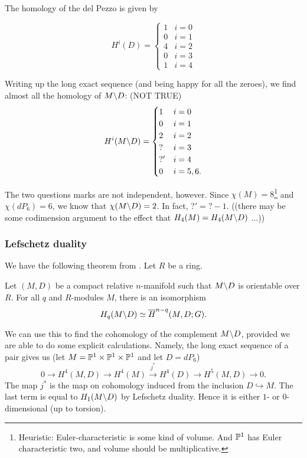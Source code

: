 \documentclass[11pt, english]{article}
\begin{document}
The homology of the del Pezzo is given by 

\[
H^i(D) = \begin{cases}
1 & i = 0 \\
0 & i = 1 \\
4 & i = 2 \\
0 & i = 3 \\
1 & i = 4
\end{cases}
\]

Writing up the long exact sequence (and being happy for all the zeroes), we find almost all the homology of $M \backslash D$: (NOT TRUE)
\[
H^i(M \backslash D) = \begin{cases}
1 & i = 0 \\
0 & i = 1 \\
2 & i = 2 \\
? & i = 3 \\
?' & i = 4 \\
0 & i = 5,6.
\end{cases}
\]

The two questions marks are not independent, however. Since $\chi(M) = 8$\footnote{Heuristic: Euler-characteristic is some kind of volume. And $\mathbb{P}^1$ has Euler characteristic two, and volume should be multiplicative.} and $\chi(dP_6)=6$, we know that $\chi(M \backslash D) = 2$. In fact, $?'=?-1$. ((there may be some codimension argument to the effect that $H_4(M) = H_4(M \backslash D)$ ...))

\subsubsection{Lefschetz duality}

We have the following theorem from \cite[Chapter 6, p.~297]{spanier_topology}. Let $R$ be a ring.

\begin{thm}
Let $(M,D)$ be a compact relative $n$-manifold such that $M\backslash D$ is orientable over $R$. For all $q$ and $R$-modules $M$, there is an isomorphism
$$
H_q(M \backslash D ) \simeq \overline H^{n-q}(M,D;G).
$$
\end{thm}

We can use this to find the cohomology of the complement $M \backslash D$, provided we are able to do some explicit calculations. Namely, the long exact sequence of a pair gives us (let $M=\mathbb{P}^1 \times \mathbb{P}^1 \times \mathbb{P}^1$ and let $D=dP_6$)
$$
0 \to H^4(M,D) \to H^4(M) \xrightarrow{j^\ast} H^4(D) \to H^5(M,D) \to 0.
$$
The map $j^\ast$ is the map on cohomology induced from the inclusion $D \hookrightarrow M$. The last term is equal to $H_1(M \backslash D)$ by Lefschetz duality. Hence it is either $1$- or $0$-dimensional (up to torsion). 
\end{document}
